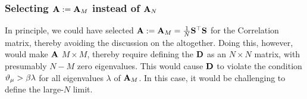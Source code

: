 \subsubsection{Selecting $\mathbf{A}:=\mathbf{A}_M$ instead of $\mathbf{A}_N$}
\label{sxn:tanaka_end}
In principle, we could have selected $\mathbf{A}:=\mathbf{A}_M=\tfrac{1}{N}{\mathbf{S}}^{\top}{\mathbf{S}}$  for the \Student Correlation matrix,
thereby avoiding the discussion on the \DualityOfMeasures altogether.
Doing this, however, would make $\mathbf{A}$ $M\times M$, thereby
require defining the \SourceMatrix $\mathbf{D}$ as an
$N \times N$ matrix, with presumably $N-M$ zero eigenvalues.
This would cause $\mathbf{D}$ to violate the condition $\vartheta_{\mu} > \beta\lambda$
for all eigenvalues $\lambda$ of $\mathbf{A}_M$.
In this case, it would be challenging to define the large-$N$ limit.
